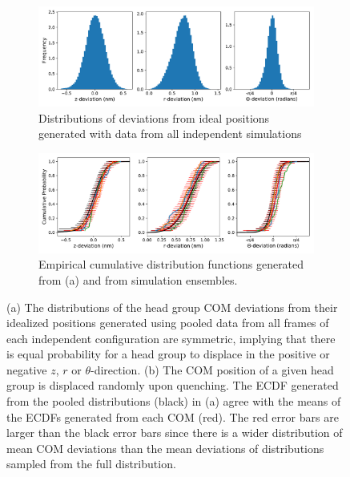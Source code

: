 \documentclass[journal=jpcbfk,manuscript=article]{achemso}
\begin{document}
  \begin{figure}[!htb]
  \centering
  \begin{subfigure}{\textwidth}
  \includegraphics[width=\textwidth]{offset_ensemble_pooled.pdf}
  \caption{Distributions of deviations from ideal positions generated with data
  from all independent simulations}\label{fig:offset_ensemble_pooled}
  \end{subfigure}
  \begin{subfigure}{\textwidth}
  \includegraphics[width=\textwidth]{offset_ecdfs.pdf}
  \caption{Empirical cumulative distribution functions generated from (a) and
  from simulation ensembles.}\label{fig:offset_ecdfs}
  \end{subfigure}
  \caption{(a) The distributions of the head group COM deviations
  from their idealized positions generated using pooled data from all
  frames of each independent configuration are symmetric, implying that 
  there is equal probability for a head group to displace in the positive
  or negative $z$, $r$ or $\theta$-direction. (b) The COM position of a 
  given head group is displaced randomly upon quenching. The ECDF generated from
  the pooled distributions (black) in (a) agree with the means of the 
  ECDFs generated from each COM (red). The red error bars are larger than
  the black error bars since there is a wider distribution of mean COM
  deviations than the mean deviations of distributions sampled from the full
  distribution.}\label{fig:full_ensemble_distributions}
  \end{figure}
  
\end{document}

